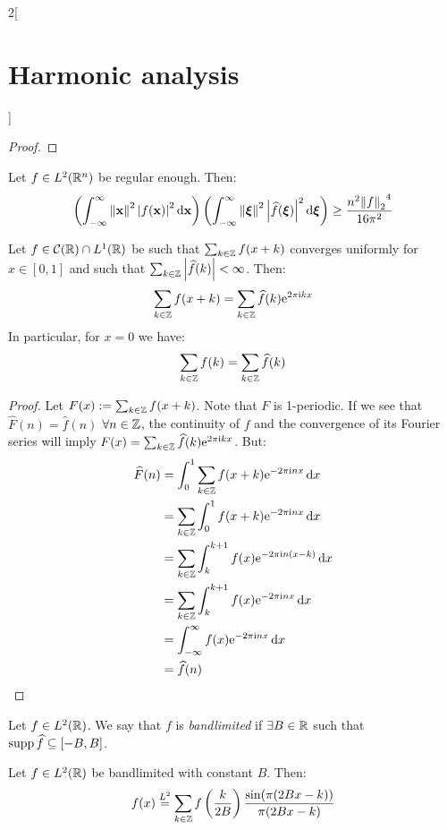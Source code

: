 \documentclass[../../../main_math.tex]{subfiles}
\begin{document}
\begin{multicols}{2}[\section{Harmonic analysis}]
\begin{proof}
  \end{proof}
  \begin{theorem}
    Let $f\in L^2(\mathbb{R}^n)$ be regular enough. Then:
    $$\left(\int_{-\infty}^\infty \left\|\boldsymbol{\mathrm{x}}\right\|^2 \abs{f(\boldsymbol{\mathrm{x}})}^2\dd{\boldsymbol{\mathrm{x}}}\right)\left(\int_{-\infty}^\infty \left\|\boldsymbol{\mathrm{\xi}}\right\|^2 \abs{\widehat{f}(\boldsymbol{\mathrm{\xi}})}^2\dd{\boldsymbol{\mathrm{\xi}}}\right)\geq \frac{n^2{\left\|f\right\|_2}^4}{16\pi^2}$$
  \end{theorem}
  \begin{theorem}
    Let $f\in\mathcal{C}(\mathbb{R})\cap L^1(\mathbb{R})$ be such that $\sum_{k\in\mathbb{Z}}f(x+k)$ converges uniformly for $x\in[0,1]$ and such that $\sum_{k\in\mathbb{Z}}\abs{\widehat{f}(k)}<\infty$. Then:
    $$\sum_{k\in\mathbb{Z}}f(x+k)=\sum_{k\in\mathbb{Z}}\widehat{f}(k)\mathrm{e}^{2\pi\mathrm{i} k x}$$
    In particular, for $x=0$ we have:
    $$\sum_{k\in\mathbb{Z}}f(k)=\sum_{k\in\mathbb{Z}}\widehat{f}(k)$$
  \end{theorem}
  \begin{proof}
    Let $F(x):=\sum_{k\in\mathbb{Z}}f(x+k)$. Note that $F$ is 1-periodic. If we see that $\widehat{F}(n)=\widehat{f}(n)$ $\forall n\in\mathbb{Z}$, the continuity of $f$ and the convergence of its Fourier series will imply $F(x)=\sum_{k\in\mathbb{Z}}\widehat{f}(k)\mathrm{e}^{2\pi\mathrm{i} k x}$. But:
    \begin{align*}
      \widehat{F}(n) & =\int_{0}^{1}\sum_{k\in\mathbb{Z}}f(x+k)\mathrm{e}^{-2\pi\mathrm{i} n x}\dd{x}     \\
                     & =\sum_{k\in\mathbb{Z}}\int_{0}^{1}f(x+k)\mathrm{e}^{-2\pi\mathrm{i} n x}\dd{x}     \\
                     & =\sum_{k\in\mathbb{Z}}\int_{k}^{k+1}f(x)\mathrm{e}^{-2\pi\mathrm{i} n (x-k)}\dd{x} \\
                     & =\sum_{k\in\mathbb{Z}}\int_{k}^{k+1}f(x)\mathrm{e}^{-2\pi\mathrm{i} n x}\dd{x}     \\
                     & =\int_{-\infty}^{\infty}f(x)\mathrm{e}^{-2\pi\mathrm{i} n x}\dd{x}          \\
                     & =\widehat{f}(n)
    \end{align*}
  \end{proof}
  \begin{definition}
    Let $f\in L^2(\mathbb{R})$. We say that $f$ is \emph{bandlimited} if $\exists B\in\mathbb{R}$ such that $\operatorname{supp}\widehat{f}\subseteq[-B,B]$.
  \end{definition}
  \begin{theorem}\label{HA:nyquistShannon}
    Let $f\in L^2(\mathbb{R})$ be bandlimited with constant $B$. Then:
    $$f(x)\overset{L^2}{=}\sum_{k\in\mathbb{Z}}f\left(\frac{k}{2B}\right)\frac{\sin(\pi(2Bx-k))}{\pi(2Bx-k)}$$

\end{theorem}
\end{multicols}
\end{document}
